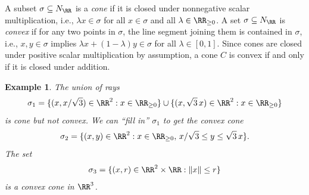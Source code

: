 \documentclass[12pt]{amsart}
\theoremstyle{plain}
\newtheorem{example}[theorem]{Example}
\begin{document}
A subset $\sigma \subseteq N_\RR$ is a \emph{cone} if it is closed under nonnegative scalar multiplication, i.e., $\lambda x \in \sigma$ for all $x \in \sigma$ and all $\lambda \in \RR_{\ge 0}$.
A set $\sigma \subseteq N_\RR$ is \emph{convex} if for any two points in $\sigma$, the line segment joining them is contained in $\sigma$,
i.e., $x, y \in \sigma$ implies $\lambda x + (1 - \lambda) y \in \sigma$ for all $\lambda \in [0, 1]$.
Since cones are closed under positive scalar multiplication by assumption, a cone $C$ is convex if and only if it is closed under addition.

\begin{example}\label{coneexamples}
The union of rays
$$\sigma_1 = \{(x, x/\sqrt{3}) \in \RR^2: x \in \RR_{\ge 0}\} \cup \{(x, \sqrt{3} \, x) \in \RR^2 : x \in \RR_{\ge 0} \}$$
is cone but not convex.
We can ``fill in'' $\sigma_1$ to get the convex cone
$$\sigma_2 = \{(x, y) \in \RR^2 : x \in \RR_{\ge 0}, \, x/\sqrt{3} \le y \le \sqrt{3} \, x\}.$$
The set
$$\sigma_3 = \{(x, r) \in \RR^2 \times \RR : \|x\| \le r\}$$
is a convex cone in $\RR^3$.


\end{example}
\end{document}
